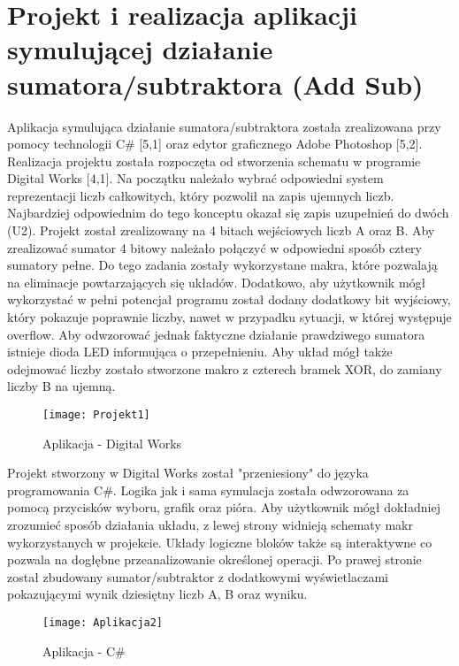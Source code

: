 \documentclass[12pt, a4paper, onside, polish]{article}				%
\begin{document}
\section{Projekt i realizacja aplikacji symulującej działanie sumatora/subtraktora (Add Sub)}
\hspace{\parindent}
Aplikacja symulująca działanie sumatora/subtraktora została zrealizowana przy pomocy technologii C\# [5,1] oraz edytor graficznego Adobe Photoshop [5,2]. Realizacja projektu została rozpoczęta od stworzenia schematu w programie Digital Works [4,1]. Na początku należało wybrać odpowiedni system reprezentacji liczb całkowitych, który pozwolił na zapis ujemnych liczb. Najbardziej odpowiednim do tego konceptu okazał się zapis uzupełnień do dwóch (U2). Projekt został zrealizowany na 4 bitach wejściowych liczb A oraz B. Aby zrealizować sumator 4 bitowy należało połączyć w odpowiedni sposób cztery sumatory pełne. Do tego zadania zostały wykorzystane makra, które pozwalają na eliminacje powtarzających się układów. Dodatkowo, aby użytkownik mógł wykorzystać w pełni potencjał programu został dodany dodatkowy bit wyjściowy, który pokazuje poprawnie liczby, nawet w przypadku sytuacji, w której występuje overflow. Aby odwzorować jednak faktyczne działanie prawdziwego sumatora istnieje dioda LED informująca o przepełnieniu. Aby układ mógł także odejmować liczby zostało stworzone makro z czterech bramek XOR, do zamiany liczby B na ujemną. 

   	\begin{figure}[hbt!]
  	  {\centering \texttt{[image: Projekt1]} \caption{Aplikacja - Digital Works}}\vspace{5mm}
  	 \end{figure}
  	 
  	 
	Projekt stworzony w Digital Works został "przeniesiony" do języka programowania C\#. Logika jak i sama symulacja została odwzorowana za pomocą przycisków wyboru, grafik oraz pióra. Aby użytkownik mógł dokładniej zrozumieć sposób działania układu, z lewej strony widnieją schematy makr wykorzystanych w projekcie. Układy logiczne bloków także są interaktywne co pozwala na dogłębne przeanalizowanie określonej operacji. Po prawej stronie został zbudowany sumator/subtraktor z dodatkowymi wyświetlaczami pokazującymi wynik dziesiętny liczb A, B oraz wyniku.
	
	  \begin{figure}[hbt!]
  	  {\centering \texttt{[image: Aplikacja2]} \caption{Aplikacja - C\#}}\vspace{5mm}
  	 \end{figure}
  	 
\end{document}
